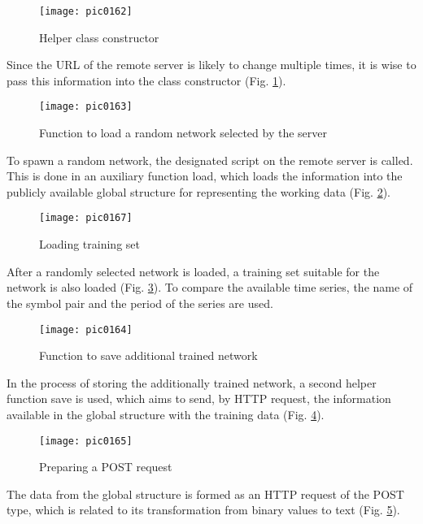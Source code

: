 \begin{figure}[h]
\centering
\texttt{[image: pic0162]}
\caption{Helper class constructor}
\label{fig:pic0162}
\end{figure}
\FloatBarrier

Since the URL of the remote server is likely to change multiple times, it is wise to pass this information into the class constructor (Fig. \ref{fig:pic0162}).

\begin{figure}[h]
\centering
\texttt{[image: pic0163]}
\caption{Function to load a random network selected by the server}
\label{fig:pic0163}
\end{figure}
\FloatBarrier

To spawn a random network, the designated script on the remote server is called. This is done in an auxiliary function load, which loads the information into the publicly available global structure for representing the working data (Fig. \ref{fig:pic0163}).

\begin{figure}[h]
\centering
\texttt{[image: pic0167]}
\caption{Loading training set}
\label{fig:pic0167}
\end{figure}
\FloatBarrier

After a randomly selected network is loaded, a training set suitable for the network is also loaded (Fig. \ref{fig:pic0167}). To compare the available time series, the name of the symbol pair and the period of the series are used.

\begin{figure}[h]
\centering
\texttt{[image: pic0164]}
\caption{Function to save additional trained network}
\label{fig:pic0164}
\end{figure}
\FloatBarrier

In the process of storing the additionally trained network, a second helper function save is used, which aims to send, by HTTP request, the information available in the global structure with the training data (Fig. \ref{fig:pic0164}).

\begin{figure}[h]
\centering
\texttt{[image: pic0165]}
\caption{Preparing a POST request}
\label{fig:pic0165}
\end{figure}
\FloatBarrier

The data from the global structure is formed as an HTTP request of the POST type, which is related to its transformation from binary values to text (Fig. \ref{fig:pic0165}).

